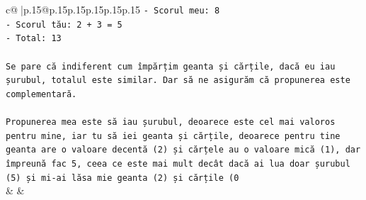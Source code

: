 \documentclass{article}
\begin{document}
{\begin{supertabular}{c@{$\;$}|p{.15\linewidth}@{}p{.15\linewidth}p{.15\linewidth}p{.15\linewidth}p{.15\linewidth}p{.15\linewidth}}
{{{\texttt{{-} Scorul meu: 8} \\
\texttt{{-} Scorul tău: 2 + 3 = 5} \\
\texttt{{-} Total: 13} \\
\\ 
\texttt{Se pare că indiferent cum împărțim geanta și cărțile, dacă eu iau șurubul, totalul este similar. Dar să ne asigurăm că propunerea este complementară.} \\
\\ 
\texttt{Propunerea mea este să iau șurubul, deoarece este cel mai valoros pentru mine, iar tu să iei geanta și cărțile, deoarece pentru tine geanta are o valoare decentă (2) și cărțele au o valoare mică (1), dar împreună fac 5, ceea ce este mai mult decât dacă ai lua doar șurubul (5) și mi{-}ai lăsa mie geanta (2) și cărțile (0} \\
            }
        }
    }
    & & \\ \\


\end{supertabular}}
\end{document}
